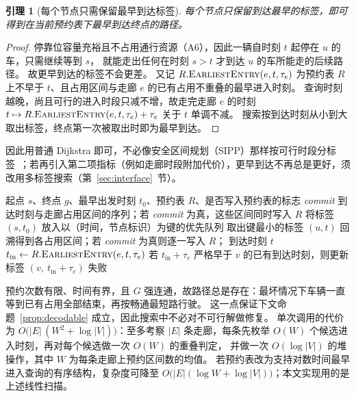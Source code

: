 \documentclass[manuscript,screen,review]{acmart}
\newtheorem{lem}{引理}
\begin{document}
\begin{lem}[每个节点只需保留最早到达标签]
\label{lem:label}
每个节点只保留到达最早的标签，即可得到在当前预约表下最早到达终点的路径。
\end{lem}

\begin{proof}
  停靠位容量充裕且不占用通行资源（A6），因此一辆自时刻 $t$ 起停在 $u$ 的车，只需继续等到 $s$，
  就能走出任何在时刻 $s>t$ 才到达 $u$ 的车所能走的后续路径。
  故更早到达的标签不会更差。
  又记 $R.\textsc{EarliestEntry}(e,t,\tau_e)$ 为预约表 $R$ 上不早于 $t$、且占用区间与走廊 $e$ 的已有占用不重叠的最早进入时刻。
  查询时刻越晚，尚且可行的进入时段只减不增，故走完走廊 $e$ 的时刻
  $t\mapsto R.\textsc{EarliestEntry}(e,t,\tau_e)+\tau_e$
  关于 $t$ 单调不减。
  搜索按到达时刻从小到大取出标签，终点第一次被取出时即为最早到达。
\end{proof}

因此用普通 Dijkstra 即可，不必像安全区间规划（SIPP）那样按可行时段分标签~\cite{kasaura2022sipp}；若再引入第二项指标（例如走廊时段附加代价），更早到达不再总是更好，须改用多标签搜索（第~\ref{sec:interface}~节）。

\begin{algorithm}[t]
  \caption{\textsc{Route}：无冲突的单段路径规划}
  \label{alg:route}
  \small
  \begin{algorithmic}[1]
  \Require 起点 $s$、终点 $g$、最早出发时刻 $t_0$、预约表 $R$、是否写入预约表的标志 \textit{commit}
  \Ensure 到达时刻与走廊占用区间的序列；若 \textit{commit} 为真，这些区间同时写入 $R$
  \State 将标签 $(s,t_0)$ 放入以（时间，节点标识）为键的优先队列
    \State 取出键最小的标签 $(u,t)$
     \State 回溯得到各占用区间；若 \textit{commit} 为真则逐一写入 $R$；
         \Return 到达时刻 $t$ \EndIf
      \State $t_{\text{in}} \gets R.\textsc{EarliestEntry}(e,t,\tau_e)$
      \State 若 $t_{\text{in}}+\tau_e$ 严格早于 $v$ 的已有到达时刻，则更新标签 $(v,\ t_{\text{in}}+\tau_e)$
    \EndFor
  \EndWhile
  \State \Return 失败 
  \end{algorithmic}
\end{algorithm}

预约次数有限、时间有界，且 $G$ 强连通，故路径总是存在：最坏情况下车辆一直等到已有占用全部结束，再按畅通最短路行驶。
这一点保证下文命题~\ref{prop:decodable} 成立，因此搜索中不必对不可行解做修复。
单次调用的代价为 $O\bigl(|E|\,(W^{2}+\log|V|)\bigr)$：至多考察 $|E|$ 条走廊，每条先枚举 $O(W)$ 个候选进入时刻，再对每个候选做一次 $O(W)$ 的重叠判定，
并做一次 $O(\log|V|)$ 的堆操作，其中 $W$ 为每条走廊上预约区间数的均值。
若预约表改为支持对数时间最早进入查询的有序结构，复杂度可降至 $O\bigl(|E|(\log W+\log|V|)\bigr)$；本文实现用的是上述线性扫描。
\end{document}
